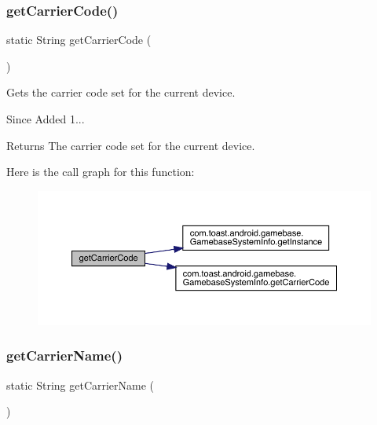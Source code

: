 \subsubsection{\texorpdfstring{get\+Carrier\+Code()}{getCarrierCode()}}
{\footnotesize\ttfamily static String get\+Carrier\+Code (\begin{DoxyParamCaption}{ }\end{DoxyParamCaption})\hspace{0.3cm}{\ttfamily [static]}}



Gets the carrier code set for the current device. 

\begin{DoxySince}{Since}
Added 1... 
\end{DoxySince}
\begin{DoxyReturn}{Returns}
The carrier code set for the current device. 
\end{DoxyReturn}
Here is the call graph for this function\+:
\nopagebreak
\begin{figure}[H]
\begin{center}
\leavevmode
\includegraphics[width=350pt]{classcom_1_1toast_1_1android_1_1gamebase_1_1_gamebase_aea83ba0122198c967d745bb4b8d97215_cgraph}
\end{center}
\end{figure}
\mbox{\label{classcom_1_1toast_1_1android_1_1gamebase_1_1_gamebase_acd4bf4656730a81853332a4a551e5e9f}} 
\subsubsection{\texorpdfstring{get\+Carrier\+Name()}{getCarrierName()}}
{\footnotesize\ttfamily static String get\+Carrier\+Name (\begin{DoxyParamCaption}{ }\end{DoxyParamCaption})\hspace{0.3cm}{\ttfamily [static]}}



